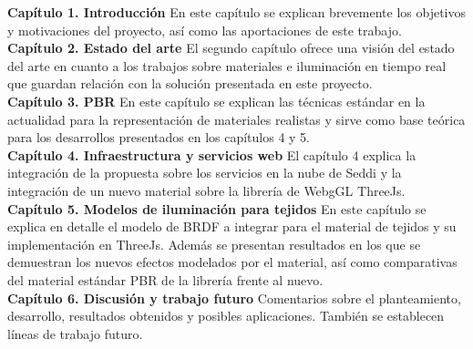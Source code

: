 \textbf{Cap\'itulo 1. Introducci\'on}
En este cap\'itulo se explican brevemente los objetivos y motivaciones del proyecto, as\'i como las aportaciones
de este trabajo.\\

\textbf{Cap\'itulo 2. Estado del arte}
El segundo cap\'itulo ofrece una visi\'on del estado del arte en cuanto a los trabajos sobre materiales e iluminaci\'on en tiempo real que guardan relaci\'on con la
soluci\'on presentada en este proyecto.\\

\textbf{Cap\'itulo 3. PBR}
En este cap\'itulo se explican las t\'ecnicas est\'andar en la actualidad para la representaci\'on de materiales realistas y
sirve como base te\'orica para los desarrollos presentados en los cap\'itulos 4 y 5.\\

\textbf{Cap\'itulo 4. Infraestructura y servicios web}
El cap\'itulo 4 explica la integraci\'on de la propuesta sobre los servicios en la nube de Seddi y la integraci\'on de un nuevo material
sobre la librer\'ia de WebgGL ThreeJs.\\

\textbf{Cap\'itulo 5. Modelos de iluminaci\'on para tejidos}
En este cap\'itulo se explica en detalle el modelo de BRDF a integrar para el material de tejidos y su implementaci\'on en ThreeJs.
Adem\'as se presentan resultados en los que se demuestran los nuevos efectos modelados por el material, as\'i como comparativas
del material est\'andar PBR de la librer\'ia frente al nuevo.\\

\textbf{Cap\'itulo 6. Discusi\'on y trabajo futuro}
Comentarios sobre el planteamiento, desarrollo, resultados obtenidos y posibles aplicaciones. Tambi\'en se establecen
l\'ineas de trabajo futuro.
